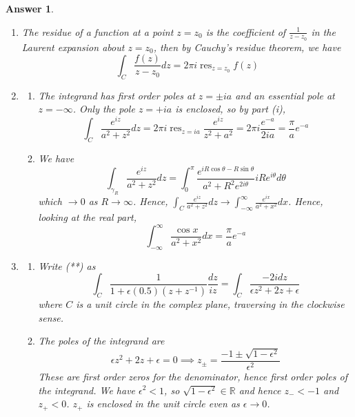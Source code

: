 \documentclass[a4paper]{article}
\DeclareMathOperator{\res}{res}
\newtheorem{ans}{Answer}[section]
\theoremstyle{new}
\begin{document}
\begin{ans}\leavevmode
\begin{enumerate}[label=(\roman*)]
\item The residue of a function at a point $z=z_0$ is the coefficient of $\frac{1}{z-z_0}$ in the Laurent expansion about $z=z_0$, then by Cauchy's residue theorem, we have
$$\int_C\frac{f(z)}{z-z_0}dz=2\pi i\res_{z=z_0}f(z)$$
\item 
\begin{enumerate}[label=(\alph*)]
\item The integrand has first order poles at $z=\pm ia$ and an essential pole at $z=-\infty$. Only the pole $z=+ia$ is enclosed, so by part (i), 
$$\int_C\frac{e^{iz}}{a^2+z^2}dz=2\pi i\res_{z=ia}\frac{e^{iz}}{z^2+a^2}=2\pi i\frac{e^{-a}}{2ia}=\frac{\pi}{a}e^{-a}$$
\begin{center}
  \end{center}
\item 
  We have 
  $$\int_{\gamma_R}\frac{e^{iz}}{a^2+z^2}dz=\int_0^\pi\frac{e^{iR\cos\theta-R\sin\theta}}{a^2+R^2e^{2i\theta}}iRe^{i\theta}d\theta$$
  which $\rightarrow 0$ as $R\rightarrow\infty$. Hence, $\int_C\frac{e^{iz}}{a^2+z^2}dz\rightarrow\int_{-\infty}^\infty\frac{e^{ix}}{a^2+x^2}dx$. Hence, looking at the real part,
  $$\int_{-\infty}^\infty\frac{\cos x}{a^2+x^2}dx=\frac{\pi}{a}e^{-a}$$
\end{enumerate}
\item
\begin{enumerate}[label=(\alph*)]
\item Write (**) as
$$\int_C\frac{1}{1+\epsilon(0.5)(z+z^{-1})}\frac{dz}{iz}=\int_C\frac{-2idz}{\epsilon z^2+2z+\epsilon}$$
where $C$ is a unit circle in the complex plane, traversing in the clockwise sense. 
\item 
The poles of the integrand are
$$\epsilon z^2+2z+\epsilon=0\implies z_{\pm}=\frac{-1\pm\sqrt{1-\epsilon^2}}{\epsilon^2}$$
These are first order zeros for the denominator, hence first order poles of the integrand. We have $\epsilon^2<1$, so $\sqrt{1-\epsilon^2}\in\mathbb{R}$ and hence
$z_-<-1$ and $z_+<0$. $z_+$ is enclosed in the unit circle even as $\epsilon\rightarrow 0$.
 \begin{center}
\end{center}
\end{enumerate}
\end{enumerate}
\end{ans}
\end{document}
